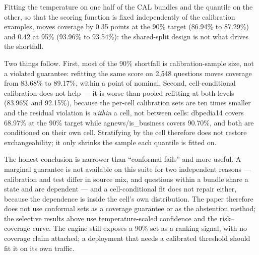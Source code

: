 \documentclass[11pt]{article}
\begin{document}
Fitting the temperature on one half of the CAL bundles and the quantile on the other, so that the
scoring function is fixed independently of the calibration examples, moves coverage by 0.35 points
at the 90\% target (86.94\% to 87.29\%) and 0.42 at 95\% (93.96\% to 93.54\%): the shared-split
design is not what drives the shortfall.

Two things follow. First, most of the 90\% shortfall
is calibration-sample size, not a violated guarantee: refitting the same score on 2{,}548 questions
moves coverage from 83.68\% to 89.17\%, within a point of nominal. Second, cell-conditional
calibration does not help — it is worse than pooled refitting at both levels (83.96\% and 92.15\%),
because the per-cell calibration sets are ten times smaller and the residual violation is
\emph{within} a cell, not between cells: dbpedia14 covers 68.97\% at the 90\% target while
agnews/is\_business covers 90.70\%, and both are conditioned on their own cell. Stratifying by the
cell therefore does not restore exchangeability; it only shrinks the sample each quantile is fitted
on.

The honest conclusion is narrower than ``conformal fails'' and more useful. A marginal guarantee is
not available on this suite for two independent reasons — calibration and test differ in source mix,
and questions within a bundle share a state and are dependent — and a cell-conditional fit does not
repair either, because the dependence is inside the cell's own distribution. The paper therefore
does not use conformal sets as a coverage guarantee or as the abstention method; the selective
results above use temperature-scaled confidence and the risk--coverage curve. The engine still
exposes a 90\% set as a ranking signal, with no coverage claim attached; a deployment that needs a
calibrated threshold should fit it on its own traffic.
\end{document}
